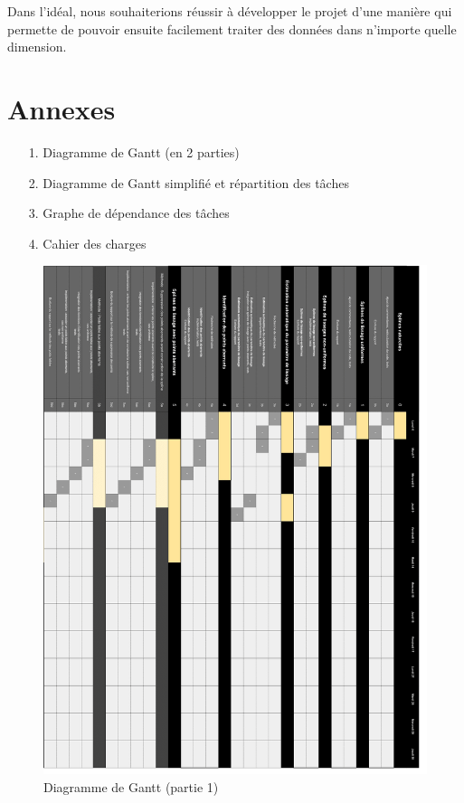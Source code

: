 \documentclass[a4paper,12pt]{article} %
\begin{document}
Dans l'idéal, nous souhaiterions réussir à développer le projet d'une manière qui permette de pouvoir ensuite facilement traiter des données dans n'importe quelle dimension.

\section*{Annexes}

\begin{itemize}
\item[1.] Diagramme de Gantt (en 2 parties)
\item[2.] Diagramme de Gantt simplifié et répartition des tâches
\item[3.] Graphe de dépendance des tâches
\item[4.] Cahier des charges
\end{itemize}
\begin{figure}
\begin{center}
\includegraphics[width=16cm]{p1.png} 
\end{center}
\caption{Diagramme de Gantt (partie 1)}
\label{DiagG1}
\end{figure}
\end{document}
